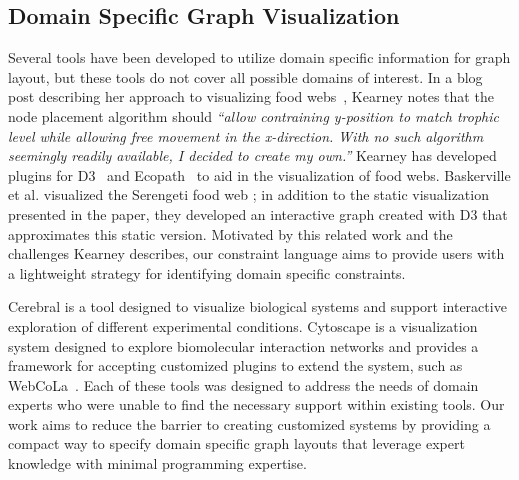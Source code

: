 
\subsection{Domain Specific Graph Visualization}
 Several tools have been developed to utilize
domain specific information for graph layout, but these tools do not cover
all possible domains of interest. In a blog post describing her approach to
visualizing food webs~\cite{kearney2016blog}, Kearney notes that the node
placement algorithm should \emph{``allow contraining y-position to match
  trophic level while allowing free movement in the x-direction. With no
  such algorithm seemingly readily available, I decided to create my
  own.''} Kearney has developed plugins for D3~\cite{kearney2017d3} and
Ecopath~\cite{kearney2017ecopath} to aid in the visualization of
food webs. Baskerville et al. visualized the Serengeti food web
\cite{baskerville2011spatial}; in addition to the static visualization
presented in the paper, they developed an interactive graph
\cite{baskerville2011interactive} created with D3 that approximates this
static version.  Motivated by this related work and the
challenges Kearney describes, our constraint language aims to provide users
with a lightweight strategy for identifying domain specific constraints.

Cerebral \cite{barsky2008cerebral} is a tool designed to visualize
biological systems and support interactive exploration of different
experimental conditions. Cytoscape \cite{shannon2003cytoscape} is a
visualization system designed to explore biomolecular interaction networks
and provides a framework for accepting customized plugins to extend the
system, such as WebCoLa~\cite{WebCoLa}. Each of these tools was designed to
address the needs of domain experts who were unable to find the necessary
support within existing tools. Our work aims to reduce the barrier to
creating customized systems by providing a compact way to specify domain
specific graph layouts that leverage expert knowledge with minimal
programming expertise.





